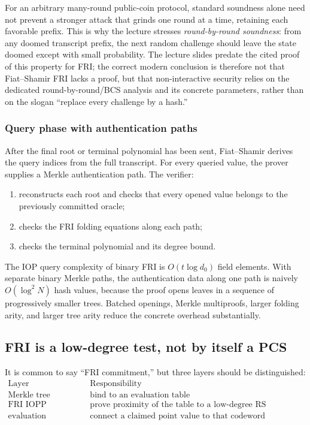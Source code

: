 For an arbitrary many-round public-coin protocol, standard soundness alone need not prevent a
stronger attack that grinds one round at a time, retaining each favorable prefix. This is why the
lecture stresses \emph{round-by-round soundness}: from any doomed transcript prefix, the next
random challenge should leave the state doomed except with small probability. The lecture slides
predate the cited proof of this property for FRI; the correct modern conclusion is therefore not
that Fiat--Shamir FRI lacks a proof, but that non-interactive security relies on the dedicated
round-by-round/BCS analysis and its concrete parameters, rather than on the slogan ``replace every
challenge by a hash.''

\subsubsection*{Query phase with authentication paths}

After the final root or terminal polynomial has been sent, Fiat--Shamir derives the query
indices from the full transcript. For every queried value, the prover supplies a Merkle
authentication path. The verifier:
\begin{enumerate}[leftmargin=2em]
    \item reconstructs each root and checks that every opened value belongs to the previously
    committed oracle;
    \item checks the FRI folding equations along each path;
    \item checks the terminal polynomial and its degree bound.
\end{enumerate}

The IOP query complexity of binary FRI is $O(t\log d_0)$ field elements. With separate
binary Merkle paths, the authentication data along one path is naively $O(\log^2 N)$ hash
values, because the proof opens leaves in a sequence of progressively smaller trees. Batched
openings, Merkle multiproofs, larger folding arity, and larger tree arity reduce the concrete
overhead substantially.

\subsection{FRI is a low-degree test, not by itself a PCS}

It is common to say ``FRI commitment,'' but three layers should be distinguished:
\[
\begin{array}{c|c}
\text{Layer} & \text{Responsibility}\\
\hline
\text{Merkle tree} & \text{bind to an evaluation table}\\
\text{FRI IOPP} & \text{prove proximity of the table to a low-degree RS codeword}\\
\text{evaluation reduction} & \text{connect a claimed point value to that codeword}
\end{array}
\]

